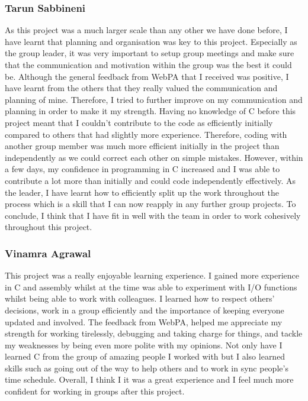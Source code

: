 \documentclass[11pt]{article}
\begin{document}
\subsubsection{Tarun Sabbineni}
As this project was a much larger scale than any other we have done before, I have learnt that planning and organisation was key to this project. Especially as the group leader, it was very important to setup group meetings and make sure that the communication and motivation within the group was the best it could be. Although the general feedback from WebPA that I received was positive, I have learnt from the others that they really valued the communication and planning of mine. Therefore, I tried to further improve on my communication and planning in order to make it my strength. Having no knowledge of C before this project meant that I couldn't contribute to the code as efficiently initially compared to others that had slightly more experience. Therefore, coding with another group member was much more efficient initially in the project than independently as we could correct each other on simple mistakes. However, within a few days, my confidence in programming in C increased and I was able to contribute a lot more than initially and could code independently effectively. As the leader, I have learnt how to efficiently split up the work throughout the process which is a skill that I can now reapply in any further group projects. To conclude, I think that I have fit in well with the team in order to work cohesively throughout this project. 

\subsubsection{Vinamra Agrawal}
This project was a really enjoyable learning experience. I gained more experience in C and assembly whilst at the time was able to experiment with I/O functions whilst being able to work with colleagues. I learned how to respect others' decisions, work in a group efficiently and the importance of keeping everyone updated and involved. The feedback from WebPA, helped me appreciate my  strength for working tirelessly, debugging and taking charge for things, and tackle my weaknesses by being even more polite with my opinions. Not only have I learned C from the group of amazing people I worked with but I also learned skills such as going out of the way to help others and to work in sync people's time schedule.  Overall, I think I it was a great experience and I feel much more confident for working in groups after this project.
\end{document}
